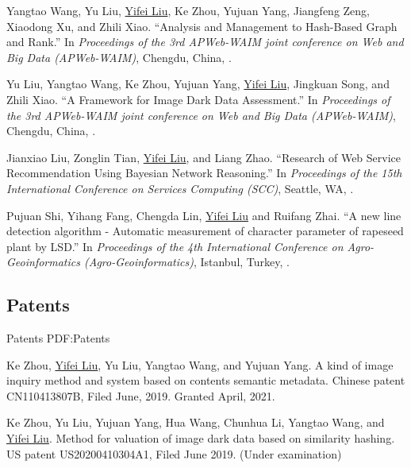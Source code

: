\documentclass[letterpaper,10pt,oneside]{article}
\begin{document}
\begin{body}
\BigGap
\NumberedItem{[3]}
Yangtao Wang, Yu Liu, \underline{Yifei Liu}, Ke Zhou, Yujuan Yang, Jiangfeng Zeng, Xiaodong Xu, and Zhili Xiao.
``Analysis and Management to Hash-Based Graph and Rank.''
In \textit{Proceedings of the 3rd APWeb-WAIM joint conference on Web and Big Data (APWeb-WAIM)}, Chengdu, China,
.

\BigGap
\NumberedItem{[4]}
Yu Liu, Yangtao Wang, Ke Zhou, Yujuan Yang, \underline{Yifei Liu}, Jingkuan Song, and Zhili Xiao.
``A Framework for Image Dark Data Assessment.''
In \textit{Proceedings of the 3rd APWeb-WAIM joint conference on Web and Big Data (APWeb-WAIM)}, Chengdu, China,
.

\BigGap
\NumberedItem{[5]}
{Jianxiao Liu, Zonglin Tian, \underline{Yifei Liu}, and Liang Zhao.
``Research of Web Service Recommendation Using Bayesian Network Reasoning.''
In \textit{Proceedings of the 15th International Conference on Services Computing (SCC)},
Seattle, WA,
.}

\BigGap
\NumberedItem{[6]}
{Pujuan Shi, Yihang Fang, Chengda Lin, \underline{Yifei Liu} and Ruifang Zhai.
``A new line detection algorithm - Automatic measurement of character parameter of rapeseed plant by LSD.''
In \textit{Proceedings of the 4th International Conference on Agro-Geoinformatics (Agro-Geoinformatics)},
Istanbul, Turkey,
.}
\BigGap
\GapNoBreak

\subsection
{Patents}
{Patents}
{PDF:Patents}
\GapNoBreak

\NumberedItem{[1]}
Ke Zhou, \underline{Yifei Liu}, Yu Liu, Yangtao Wang, and Yujuan Yang. A kind of image inquiry method and system based on contents semantic metadata. Chinese patent CN110413807B, Filed June, 2019. Granted April, 2021.

\BigGap
\NumberedItem{[2]}
Ke Zhou, Yu Liu, Yujuan Yang, Hua Wang, Chunhua Li, Yangtao Wang, and \underline{Yifei Liu}. Method for valuation of image dark data based on similarity hashing. US patent US20200410304A1, Filed June 2019. (Under  examination)
\GapNoBreak


\end{body}
\end{document}

